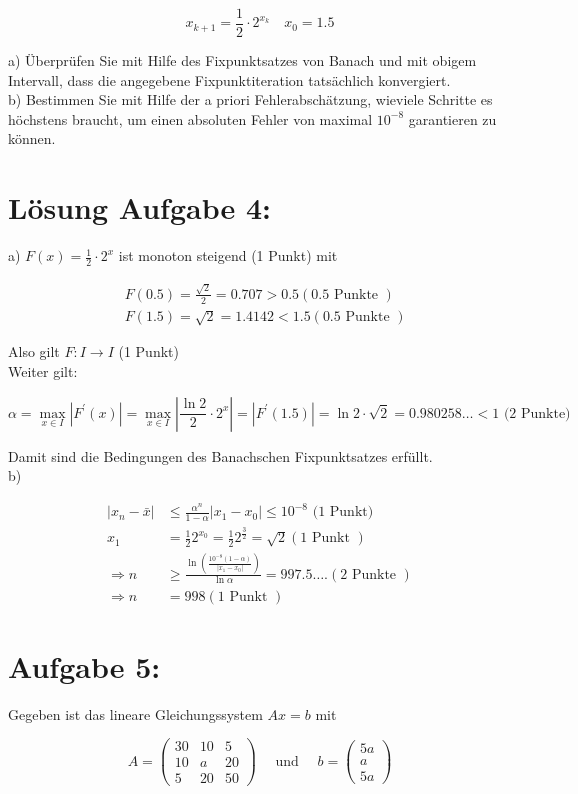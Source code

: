 \documentclass[10pt]{article}
\begin{document}
$$
x_{k+1}=\frac{1}{2} \cdot 2^{x_{k}} \quad x_{0}=1.5
$$

a) Überprüfen Sie mit Hilfe des Fixpunktsatzes von Banach und mit obigem Intervall, dass die angegebene Fixpunktiteration tatsächlich konvergiert.\\
b) Bestimmen Sie mit Hilfe der a priori Fehlerabschätzung, wieviele Schritte es höchstens braucht, um einen absoluten Fehler von maximal $10^{-8}$ garantieren zu können.

\section*{Lösung Aufgabe 4:}
a) $F(x)=\frac{1}{2} \cdot 2^{x}$ ist monoton steigend (1 Punkt) mit

$$
\begin{aligned}
& F(0.5)=\frac{\sqrt{2}}{2}=0.707>0.5(0.5 \text { Punkte }) \\
& F(1.5)=\sqrt{2}=1.4142<1.5(0.5 \text { Punkte })
\end{aligned}
$$

Also gilt $F: I \longrightarrow I$ (1 Punkt)\\
Weiter gilt:

$$
\alpha=\max _{x \in I}\left|F^{\prime}(x)\right|=\max _{x \in I}\left|\frac{\ln 2}{2} \cdot 2^{x}\right|=\left|F^{\prime}(1.5)\right|=\ln 2 \cdot \sqrt{2}=0.980258 \ldots<1 \text { (2 Punkte) }
$$

Damit sind die Bedingungen des Banachschen Fixpunktsatzes erfüllt.\\
b)

$$
\begin{aligned}
\left|x_{n}-\bar{x}\right| & \leq \frac{\alpha^{n}}{1-\alpha}\left|x_{1}-x_{0}\right| \leq 10^{-8} \text { (1 Punkt) } \\
x_{1} & =\frac{1}{2} 2^{x_{0}}=\frac{1}{2} 2^{\frac{3}{2}}=\sqrt{2}(1 \text { Punkt }) \\
\Rightarrow n & \geq \frac{\ln \left(\frac{10^{-8}(1-\alpha)}{\left|x_{1}-x_{0}\right|}\right)}{\ln \alpha}=997.5 \ldots .(2 \text { Punkte }) \\
\Rightarrow n & =998(1 \text { Punkt })
\end{aligned}
$$

\section*{Aufgabe 5:}
Gegeben ist das lineare Gleichungssystem $A x=b$ mit

$$
A=\left(\begin{array}{ccc}
30 & 10 & 5 \\
10 & a & 20 \\
5 & 20 & 50
\end{array}\right) \quad \text { und } \quad b=\left(\begin{array}{c}
5 a \\
a \\
5 a
\end{array}\right)
$$
\end{document}
